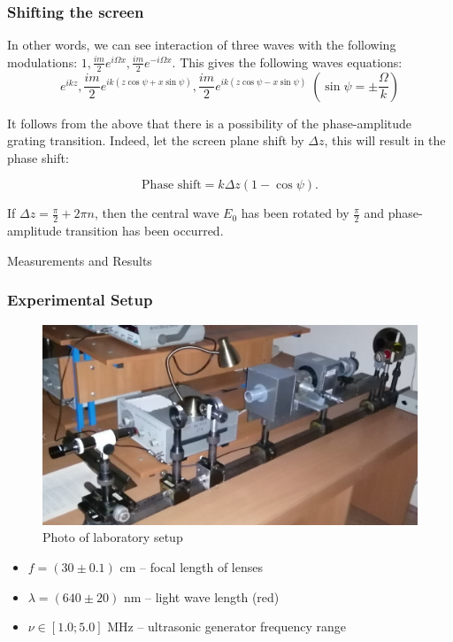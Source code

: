 \documentclass{beamer}
\begin{document}
		\begin{frame}
		\frametitle{Shifting the screen}

		In other words, we can see interaction of three waves with the following modulations:
		 $1, \frac{im}{2}e^{i \Omega x},\frac{im}{2}e^{-i \Omega x}$. This gives the following waves equations: 
		$$e^{i kz}, \frac{im}{2}e^{i k(z\cos{\psi} + x\sin{\psi})},\frac{im}{2}e^{i k(z\cos{\psi} - x\sin{\psi})} \; \left(\sin{\psi} = \pm\frac{\Omega}{k}  \right)$$
		
		
		It follows from the above that there is a possibility of the phase-amplitude grating transition. Indeed, let the screen plane shift by $\Delta z$, this will result in the phase shift:
		
		$$\text{Phase shift} = k\Delta z(1 - \cos{\psi}).$$
		
		
		If $\Delta z = \frac{\pi}{2} + 2\pi n$, then the central wave $E_0$ has been rotated by $\frac{\pi}{2}$ and phase-amplitude transition has been occurred.
	\end{frame}



	\begin{frame}[plain,c]
		
		\begin{center}
			\huge {} Measurements and Results
		\end{center}
		
	\end{frame}



	\begin{frame}
		\frametitle{Experimental Setup}
		\begin{figure}
			\centering
			\includegraphics[width=0.8\linewidth]{res/real_setup.png}
			\caption{Photo of laboratory setup}
		\end{figure}
		
		\begin{itemize}
			\item $f = (30 \pm 0.1)$ cm -- focal length of lenses
			\item $\lambda = (640 \pm 20)$ nm -- light wave length (red)
			\item $\nu \in [1.0; 5.0]$ MHz -- ultrasonic generator frequency range
			
		\end{itemize}		
	\end{frame}
	
\end{document}
